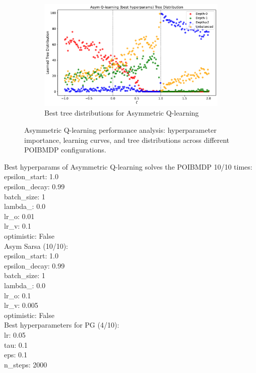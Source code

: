 \begin{figure}
\begin{subfigure}[b]{0.32\textwidth}
        \includegraphics[width=\textwidth]{images/images_part1/ql_asym_best_tree_distributions.pdf}
        \caption{Best tree distributions for Asymmetric Q-learning}
        \label{fig:best-tree-distributions}
    \end{subfigure}
    \caption{Asymmetric Q-learning performance analysis: hyperparameter importance, learning curves, and tree distributions across different POIBMDP configurations.}
    \label{fig:asym-ql-analysis}
\end{figure}




Best hyperparams of Asymmetric Q-learning solves the POIBMDP 10/10 times: \\
epsilon_start: 1.0 \\
epsilon_decay: 0.99 \\
batch_size: 1\\ 
lambda_: 0.0\\
lr_o: 0.01\\ 
lr_v: 0.1\\ 
optimistic: False \\ 

Asym Sarsa (10/10):\\ 
epsilon_start: 1.0 \\
epsilon_decay: 0.99 \\
batch_size: 1 \\ 
lambda_: 0.0 \\
lr_o: 0.1 \\ 
lr_v: 0.005 \\
optimistic: False \\

Best hyperparameters for PG (4/10): \\
lr: 0.05 \\
tau: 0.1 \\
eps: 0.1 \\
n_steps: 2000 \\

